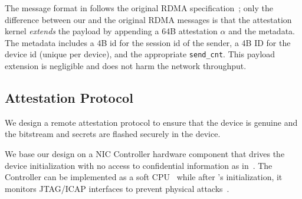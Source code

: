 The message format in \projecttitle{} follows the original RDMA specification~\cite{rdma_specification}; only the difference between our \projecttitle{} and the original RDMA messages is that the attestation kernel {\em extends} the payload by appending a 64B attestation $\alpha$ and the metadata. The metadata includes a 4B id for the session id of the sender, a 4B ID for the device id (unique per device), and the appropriate {\tt send\_cnt}. This payload extension is negligible and does not harm the network throughput.  



\subsection{\projecttitle{} Attestation Protocol} 
\label{subsec:nic_controller}
We design a remote attestation protocol to ensure that the \projecttitle{} device is genuine and the \projecttitle{} bitstream and secrets are flashed securely in the device. %

 We base our design on a NIC Controller hardware component that drives the device initialization with no access to confidential information as in~\cite{10.1145/3503222.3507733}. 
The Controller can be implemented as a soft CPU~\cite{microblaze, nios, 10.1145/3503222.3507733} while after \projecttitle{}'s initialization, it monitors JTAG/ICAP interfaces to prevent physical attacks~\cite{secMon}. 

